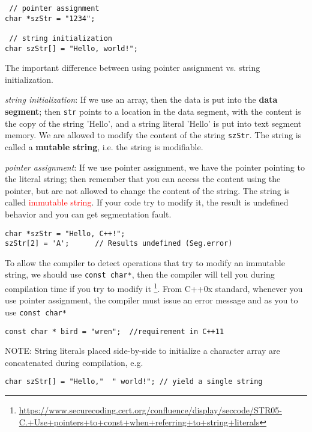 \begin{verbatim}
 // pointer assignment
char *szStr = "1234";

 // string initialization
char szStr[] = "Hello, world!";
\end{verbatim}


\begin{mdframed}
The important difference between using pointer assignment vs. string
initialization. 

{\it string initialization}: If we use an array, then the data is put into the
{\bf data segment}; then \verb!str! points to a location in the data segment,
with the content is the copy of the string 'Hello', and a string literal 'Hello'
is put into text segment memory. We are allowed to modify the content of the
string \verb!szStr!. The string is called a {\bf mutable string}, i.e. the
string is modifiable.

{\it pointer assignment}: If we use pointer assignment, we have the pointer pointing
to the literal string; then remember that you can access the
content using the pointer, but are not allowed to change the content of the
string. The string is called \textcolor{red}{immutable string}. If your code try
to modify it, the result is undefined behavior and you can get segmentation fault.
\begin{verbatim}
char *szStr = "Hello, C++!";
szStr[2] = 'A';      // Results undefined (Seg.error)
\end{verbatim}

To allow the compiler to detect operations that try to modify an immutable
string, we should use \verb!const char*!, then the compiler will tell you during
compilation time if you try to modify it \footnote{\url{https://www.securecoding.cert.org/confluence/display/seccode/STR05-C.+Use+pointers+to+const+when+referring+to+string+literals}}.
From C++0x standard, whenever you use pointer assignment, the compiler must
issue an error message and as you to use \verb!const char*!
\begin{verbatim}
const char * bird = "wren";  //requirement in C++11
\end{verbatim}
\end{mdframed}



NOTE: String literals placed side-by-side to initialize a character array are
concatenated during compilation, e.g.
\begin{verbatim}
char szStr[] = "Hello,"  " world!"; // yield a single string
\end{verbatim}

